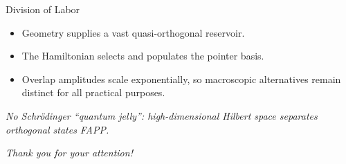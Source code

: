 \documentclass[xcolor=dvipsnames]{beamer}
\newenvironment{slideitems}{%
  \begin{itemize}\setlength{\itemsep}{0.55em}\setlength{\parskip}{0pt}%
}{\end{itemize}}
\begin{document}
\begin{frame}{Division of Labor}
\begin{slideitems}
  \item Geometry supplies a vast quasi-orthogonal reservoir.
  \item The Hamiltonian selects and populates the pointer basis.
  \item Overlap amplitudes scale exponentially, so macroscopic alternatives
        remain distinct for all practical purposes.
\end{slideitems}

\vspace{5mm}
\centering
\Large
\textit{No Schr\"odinger ``quantum jelly'': high-dimensional Hilbert space separates orthogonal states FAPP.}
\end{frame}


\begin{frame}


\vspace{5mm}
\centering
\Large
\textit{Thank you for your attention!}
\end{frame}
\end{document}
